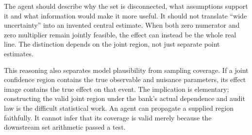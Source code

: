 The agent should describe why the set is disconnected, what assumptions support
it and what information would make it more useful. It should not translate
``wide uncertainty'' into an invented central estimate. When both zero numerator
and zero multiplier remain jointly feasible, the effect can instead be the
whole real line. The distinction depends on the joint region, not just
separate point estimates.

This reasoning also separates model plausibility from sampling coverage. If a
joint confidence region contains the true observable and nuisance parameters,
its effect image contains the true effect on that event. The implication is
elementary; constructing the valid joint region under the bank's actual
dependence and audit law is the difficult statistical work. An agent can
propagate a supplied region faithfully. It cannot infer that its coverage is
valid merely because the downstream set arithmetic passed a test.

